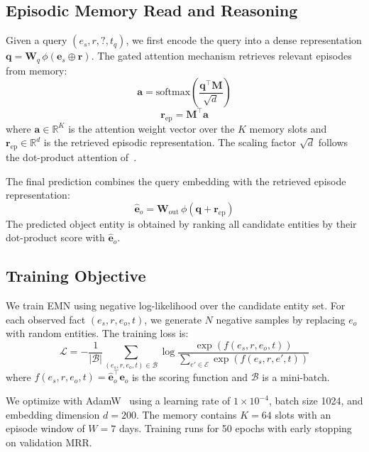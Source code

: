 \documentclass{article}
\begin{document}
\subsection{Episodic Memory Read and Reasoning}
\label{sec:method:read}

Given a query $(e_s, r, ?, t_q)$, we first encode the query into a dense representation $\mathbf{q} = \mathbf{W}_q \, \phi(\mathbf{e}_s \oplus \mathbf{r})$. The gated attention mechanism retrieves relevant episodes from memory:
\begin{equation}
\mathbf{a} = \text{softmax}\!\left(\frac{\mathbf{q}^\top \mathbf{M}}{\sqrt{d}}\right)
\label{eq:attention}
\end{equation}
\begin{equation}
\mathbf{r}_{\text{ep}} = \mathbf{M}^\top \mathbf{a}
\end{equation}
where $\mathbf{a} \in \mathbb{R}^K$ is the attention weight vector over the $K$ memory slots and $\mathbf{r}_{\text{ep}} \in \mathbb{R}^d$ is the retrieved episodic representation. The scaling factor $\sqrt{d}$ follows the dot-product attention of~\citet{vaswani2017attention}.

The final prediction combines the query embedding with the retrieved episode representation:
\begin{equation}
\hat{\mathbf{e}}_o = \mathbf{W}_{\text{out}} \, \phi(\mathbf{q} + \mathbf{r}_{\text{ep}})
\end{equation}
The predicted object entity is obtained by ranking all candidate entities by their dot-product score with $\hat{\mathbf{e}}_o$.

\subsection{Training Objective}
\label{sec:method:training}

We train EMN using negative log-likelihood over the candidate entity set. For each observed fact $(e_s, r, e_o, t)$, we generate $N$ negative samples by replacing $e_o$ with random entities. The training loss is:
\begin{equation}
\mathcal{L} = -\frac{1}{|\mathcal{B}|} \sum_{(e_s, r, e_o, t) \in \mathcal{B}} \log \frac{\exp(f(e_s, r, e_o, t))}{\sum_{e' \in \mathcal{E}} \exp(f(e_s, r, e', t))}
\end{equation}
where $f(e_s, r, e_o, t) = \hat{\mathbf{e}}_o^\top \mathbf{e}_o$ is the scoring function and $\mathcal{B}$ is a mini-batch.

We optimize with AdamW~\citep{loshchilov2018adamw} using a learning rate of $1 \times 10^{-4}$, batch size 1024, and embedding dimension $d = 200$. The memory contains $K = 64$ slots with an episode window of $W = 7$ days. Training runs for 50 epochs with early stopping on validation MRR.
\end{document}
